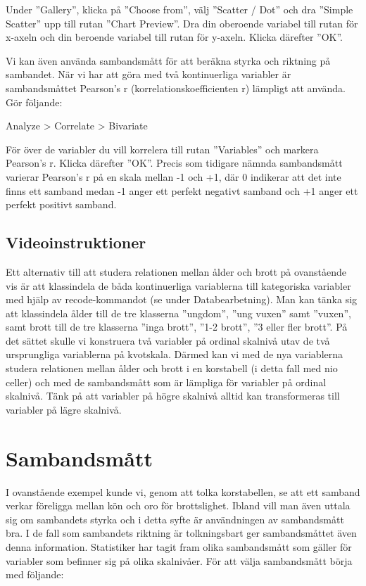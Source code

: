 \documentclass[
]{book}
\begin{document}
Under ''Gallery'', klicka på ''Choose from'', välj ''Scatter / Dot'' och dra ''Simple Scatter'' upp till rutan
''Chart Preview''. Dra din oberoende variabel till rutan för x-axeln och din beroende variabel till rutan för
y-axeln. Klicka därefter ''OK''.

Vi kan även använda sambandsmått för att beräkna styrka och riktning på sambandet. När vi har att
göra med två kontinuerliga variabler är sambandsmåttet Pearson's r (korrelationskoefficienten r)
lämpligt att använda. Gör följande:

Analyze \textgreater{} Correlate \textgreater{} Bivariate

För över de variabler du vill korrelera till rutan ''Variables'' och markera Pearson's r. Klicka därefter
''OK''. Precis som tidigare nämnda sambandsmått varierar Pearson's r på en skala mellan -1 och +1, där
0 indikerar att det inte finns ett samband medan -1 anger ett perfekt negativt samband och +1 anger ett
perfekt positivt samband.

\hypertarget{videoinstruktioner-6}{%
\subsection{Videoinstruktioner}\label{videoinstruktioner-6}}

Ett alternativ till att studera relationen mellan ålder och brott på ovanstående vis är att klassindela de
båda kontinuerliga variablerna till kategoriska variabler med hjälp av recode-kommandot (se under
Databearbetning). Man kan tänka sig att klassindela ålder till de tre klasserna ''ungdom'', ''ung vuxen''
samt ''vuxen'', samt brott till de tre klasserna ''inga brott'', ''1-2 brott'', ''3 eller fler brott''. På det sättet
skulle vi konstruera två variabler på ordinal skalnivå utav de två ursprungliga variablerna på kvotskala.
Därmed kan vi med de nya variablerna studera relationen mellan ålder och brott i en korstabell (i detta
fall med nio celler) och med de sambandsmått som är lämpliga för variabler på ordinal skalnivå. Tänk på
att variabler på högre skalnivå alltid kan transformeras till variabler på lägre skalnivå.

\hypertarget{sambandsmuxe5tt}{%
\section{Sambandsmått}\label{sambandsmuxe5tt}}

I ovanstående exempel kunde vi, genom att tolka korstabellen, se att ett samband verkar föreligga
mellan kön och oro för brottslighet. Ibland vill man även uttala sig om sambandets styrka och i detta
syfte är användningen av sambandsmått bra. I de fall som sambandets riktning är tolkningsbart ger
sambandsmåttet även denna information. Statistiker har tagit fram olika sambandsmått som gäller för
variabler som befinner sig på olika skalnivåer. För att välja sambandsmått börja med följande:
\end{document}
